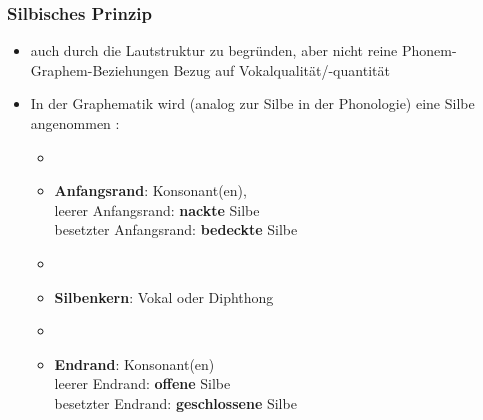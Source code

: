 \begin{frame}
\frametitle{Silbisches Prinzip}

\begin{itemize}
	\item auch durch die Lautstruktur zu begründen, aber nicht reine Phonem-Graphem-Beziehungen \ras Bezug auf Vokalqualität/-quantität
	
	\item In der Graphematik wird (analog zur Silbe in der Phonologie) eine Silbe angenommen \citep[vgl.][]{Fuhrhop08a}:
	
	\begin{itemize}
		\item[]
		\item \textbf{Anfangsrand}: Konsonant(en),\\
		leerer Anfangsrand: \textbf{nackte} Silbe\\
		besetzter Anfangsrand: \textbf{bedeckte} Silbe
		\item[]
		\item \textbf{Silbenkern}: Vokal oder Diphthong
		\item[]
		\item \textbf{Endrand}: Konsonant(en)\\
		leerer Endrand: \textbf{offene} Silbe\\
		besetzter Endrand: \textbf{geschlossene} Silbe
	\end{itemize}
\end{itemize}

\end{frame}


